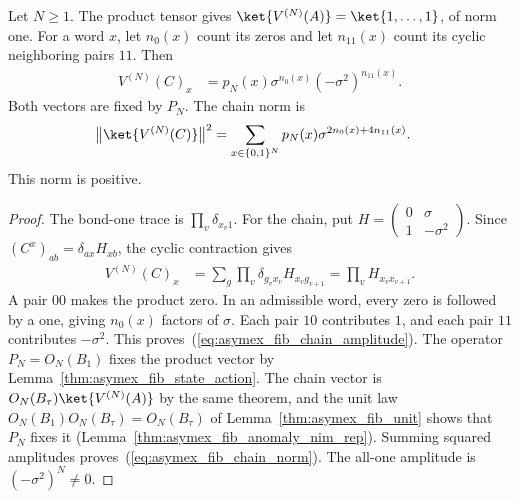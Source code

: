 \begin{lemma}
    \label{lem:asymex_fib_amplitudes}
    \leanok
    Let $N\geq1$. The product tensor gives
    $\ket{V^{(N)}(A)}=\ket{1,\ldots,1}$, of norm one.
    For a word $x$, let $n_0(x)$ count its zeros and let $n_{11}(x)$
    count its cyclic neighboring pairs $11$. Then
    \begin{align}
        V^{(N)}(C)_x
         & =p_N(x)\sigma^{n_0(x)}(-\sigma^2)^{n_{11}(x)}.
        \label{eq:asymex_fib_chain_amplitude}
    \end{align}
    Both vectors are fixed by $P_N$. The chain norm is
    \begin{align}
        \bigl\|\ket{V^{(N)}(C)}\bigr\|^2
         & =\sum_{x\in\{0,1\}^N}
        p_N(x)\sigma^{2n_0(x)+4n_{11}(x)}.
        \label{eq:asymex_fib_chain_norm}
    \end{align}
    This norm is positive.
\end{lemma}

\begin{proof}
    \leanok
    The bond-one trace is $\prod_v\delta_{x_v1}$.
    For the chain, put
    $H=\begin{pmatrix}0&\sigma\\1&-\sigma^2\end{pmatrix}$.
    Since $(C^x)_{ab}=\delta_{ax}H_{xb}$, the cyclic contraction gives
    \begin{align}
        V^{(N)}(C)_x
         & =\sum_g\prod_v\delta_{g_vx_v}H_{x_vg_{v+1}}
        =\prod_vH_{x_vx_{v+1}}.
    \end{align}
    A pair $00$ makes the product zero. In an admissible word, every
    zero is followed by a one, giving $n_0(x)$ factors of $\sigma$.
    Each pair $10$ contributes $1$, and each pair $11$ contributes
    $-\sigma^2$. This proves~(\ref{eq:asymex_fib_chain_amplitude}).
    The operator $P_N=O_N(B_1)$ fixes the product vector by
    Lemma~\ref{thm:asymex_fib_state_action}. The chain vector is
    $O_N(B_\tau)\ket{V^{(N)}(A)}$ by the same theorem, and the unit law
    $O_N(B_1)O_N(B_\tau)=O_N(B_\tau)$ of
    Lemma~\ref{thm:asymex_fib_unit} shows that $P_N$ fixes it
    (Lemma~\ref{thm:asymex_fib_anomaly_nim_rep}).
    Summing squared amplitudes proves~(\ref{eq:asymex_fib_chain_norm}).
    The all-one amplitude is $(-\sigma^2)^N\neq0$.
\end{proof}

